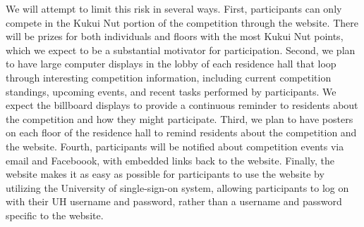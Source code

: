 We will attempt to limit this risk in several ways. First, participants can only compete in the Kukui Nut portion of the competition through the website. There will be prizes for both individuals and floors with the most Kukui Nut points, which we expect to be a substantial motivator for participation. Second, we plan to have large computer displays in the lobby of each residence hall that loop through interesting competition information, including current competition standings, upcoming events, and recent tasks performed by participants. We expect the billboard displays to provide a continuous reminder to residents about the competition and how they might participate. Third, we plan to have posters on each floor of the residence hall to remind residents about the competition and the website. Fourth, participants will be notified about competition events via email and Faceboook, with embedded links back to the website. Finally, the website makes it as easy as possible for participants to use the website by utilizing the University of \Hawaii single-sign-on system, allowing participants to log on with their UH username and password, rather than a username and password specific to the website.